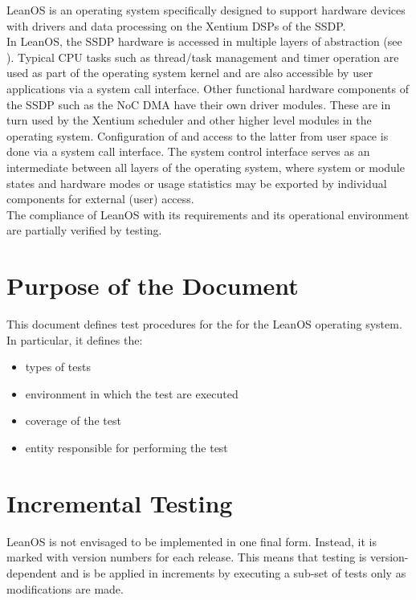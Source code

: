\noindent
LeanOS\cite{ssdpOS}\cite{leanosADD}\cite{leanosSRS} is an operating system specifically
designed to support hardware devices with drivers and data processing on the
\gls{Xentium} \glspl{DSP} of the \gls{SSDP}.\\

In LeanOS, the \gls{SSDP} hardware is accessed in multiple layers of
abstraction (see ). Typical \gls{CPU} tasks such as
thread/task management and timer operation are used as part of the operating
system kernel and are also accessible by user applications via a system call
interface.  Other functional hardware components of the \gls{SSDP} such as the
\gls{NoC} \gls{DMA} have their own driver modules. These are in turn used by
the \gls{Xentium} scheduler and other higher level modules in the operating
system.  Configuration of and access to the latter from user space is done via
a system call interface. The system control interface serves as an intermediate
between all layers of the operating system, where system or module states and
hardware modes or usage statistics may be exported by individual components for
external (user) access. \\

\noindent
The compliance of LeanOS with its requirements and its operational environment
are partially verified by testing.


\section{Purpose of the Document}

This document defines test procedures for the for the LeanOS operating system.
In particular, it defines the:
\begin{itemize}
	\item types of tests
	\item environment in which the test are executed
	\item coverage of the test
	\item entity responsible for performing the test
\end{itemize}


\section{Incremental Testing}

LeanOS is not envisaged to be implemented in one final form. Instead, it is
marked with version numbers for each release. This means that testing is
version-dependent and is be applied in increments by executing a sub-set of
tests only as modifications are made.


